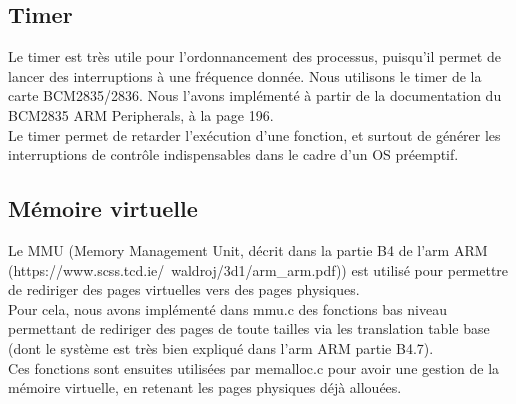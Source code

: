 \documentclass[a4paper]{article}
\begin{document}
\subsection{Timer}
Le timer est très utile pour l'ordonnancement des processus, puisqu'il permet de
lancer des interruptions à une fréquence donnée. Nous utilisons le timer de la
carte BCM2835/2836. Nous l'avons implémenté à partir de la documentation du
BCM2835 ARM Peripherals, à la page 196.\\

Le timer permet de retarder l'exécution d'une fonction, et surtout de générer
les interruptions de contrôle indispensables dans le cadre d'un OS préemptif.

\subsection{Mémoire virtuelle}

Le MMU (Memory Management Unit, décrit dans la partie B4 de l'arm ARM
(https://www.scss.tcd.ie/~waldroj/3d1/arm\_arm.pdf)) est utilisé pour permettre
de rediriger des pages virtuelles vers des pages physiques.\\

Pour cela, nous avons implémenté dans mmu.c des fonctions bas niveau permettant de
rediriger des pages de toute tailles via les translation table base (dont le
système est très bien expliqué dans l'arm ARM partie B4.7).\\

Ces fonctions sont ensuites utilisées par memalloc.c pour avoir une gestion de
la mémoire virtuelle, en retenant les pages physiques déjà allouées.
\end{document}
